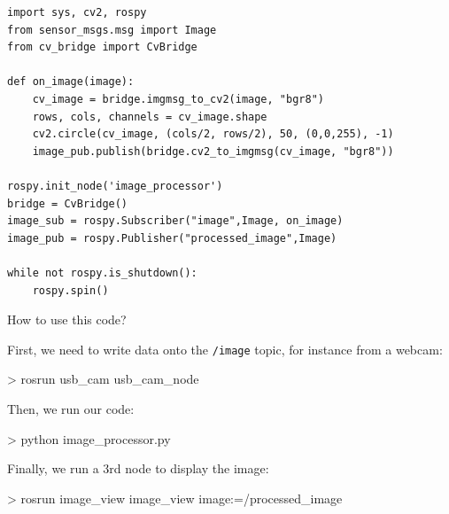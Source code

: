 \documentclass[compress]{beamer}
\begin{document}
\begin{frame}[containsverbatim]{}

\begin{verbatim}
import sys, cv2, rospy
from sensor_msgs.msg import Image
from cv_bridge import CvBridge

def on_image(image):
    cv_image = bridge.imgmsg_to_cv2(image, "bgr8")
    rows, cols, channels = cv_image.shape
    cv2.circle(cv_image, (cols/2, rows/2), 50, (0,0,255), -1)
    image_pub.publish(bridge.cv2_to_imgmsg(cv_image, "bgr8"))

rospy.init_node('image_processor')
bridge = CvBridge()
image_sub = rospy.Subscriber("image",Image, on_image)
image_pub = rospy.Publisher("processed_image",Image)

while not rospy.is_shutdown():
    rospy.spin()
\end{verbatim}

\end{frame}

\begin{frame}[fragile]{How to use this code?}

First, we need to write data onto the \texttt{/image} topic, for instance from a
webcam:

\begin{shcode}
> rosrun usb_cam usb_cam_node
\end{shcode}

\pause

Then, we run our code:

\begin{shcode}
> python image_processor.py
\end{shcode}

\pause

Finally, we run a 3rd node to display the image:

\begin{shcode}
> rosrun image_view image_view image:=/processed_image
\end{shcode}

\end{frame}


\end{document}
